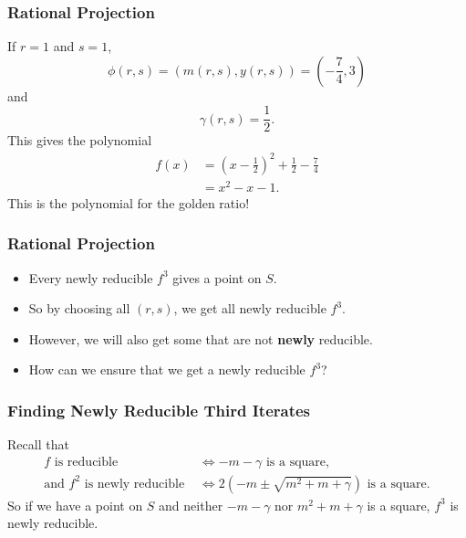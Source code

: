 \begin{frame}
	\frametitle{Rational Projection}
	\begin{example}
		If $r=1$ and $s=1$,
		$$\phi(r,s) = (m(r,s),y(r,s)) = \left(-\frac{7}{4},3\right)$$
		and
		$$\gamma(r,s) = \frac{1}{2}.$$
		\pause
		This gives the polynomial
		\begin{align*}
			f(x) &= \left(x-\frac{1}{2}\right)^2+\frac{1}{2}-\frac{7}{4} \\
			&= x^2 - x - 1.
		\end{align*}
		\pause
		This is the polynomial for the golden ratio!
	\end{example}
	
\end{frame}

\begin{frame}
	\frametitle{Rational Projection}
	\begin{itemize}
		\item<1-> Every newly reducible $f^3$ gives a point on $S$. \\
		\item<2-> So by choosing all $(r,s)$, we get all newly reducible $f^3$. \\
		\item<3-> However, we will also get some that are not \textbf{newly} reducible. \\
		\item<4-> How can we ensure that we get a newly reducible $f^3$?
	\end{itemize}
\end{frame}

\begin{frame}
	\frametitle{Finding Newly Reducible Third Iterates}
	Recall that
	\begin{align*}
		f\mbox{ is reducible } &\Leftrightarrow -m-\gamma\mbox{ is a square,} \\
		\mbox{and }f^2\mbox{ is newly reducible }&\Leftrightarrow2(-m\pm\sqrt{m^2+m+\gamma})\mbox{ is a square.}
	\end{align*}
	So if we have a point on $S$ and neither $-m-\gamma$ nor $m^2+m+\gamma$ is a square, $f^3$ is newly reducible.
\end{frame}

